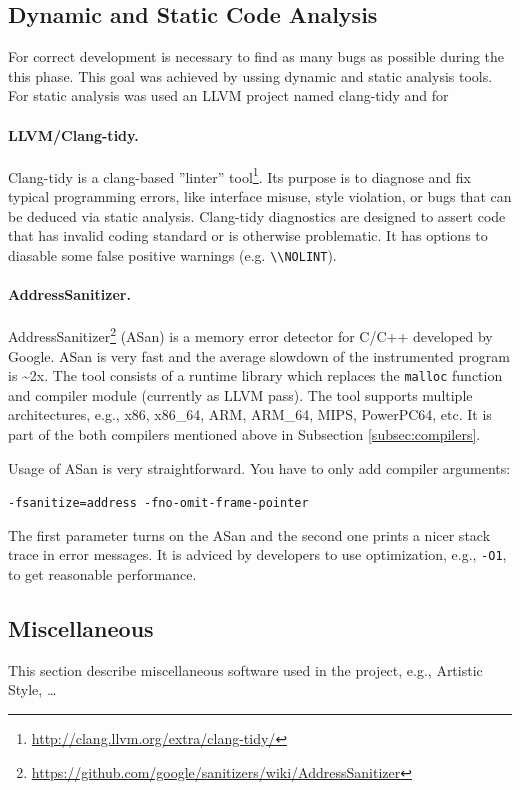 \subsection{Dynamic and Static Code Analysis}
For correct development is necessary to find as many bugs as possible during the this phase.
This goal was achieved by ussing dynamic and static analysis tools.
For static analysis was used an LLVM project named clang-tidy and for

\paragraph{LLVM/Clang-tidy.}
Clang-tidy is a clang-based ''linter'' tool\footnote{\url{http://clang.llvm.org/extra/clang-tidy/}}.
Its purpose is to diagnose and fix typical programming errors,
like interface misuse, style violation, or bugs that can be deduced via static analysis.
Clang-tidy diagnostics are designed to assert code that has invalid coding standard or is otherwise problematic.
It has options to diasable some false positive warnings (e.g. \texttt{\textbackslash\textbackslash NOLINT}).

\paragraph{AddressSanitizer.}
AddressSanitizer\footnote{\url{https://github.com/google/sanitizers/wiki/AddressSanitizer}} (ASan) is a memory error detector for C/C++ developed by Google.
ASan is very fast and the average slowdown of the instrumented program is \textasciitilde 2x.
The tool consists of a runtime library which replaces the \texttt{malloc} function and compiler module (currently as LLVM pass).
The tool supports multiple architectures, e.g., x86, x86\_64, ARM, ARM\_64, MIPS, PowerPC64, etc.
It is part of the both compilers mentioned above in Subsection \ref{subsec:compilers}.

Usage of ASan is very straightforward. You have to only add compiler arguments:\\
\begin{center}
	\texttt{-fsanitize=address -fno-omit-frame-pointer}
\end{center}
The first parameter turns on the ASan and the second one prints a nicer stack trace in error messages.
It is adviced by developers to use optimization, e.g., \texttt{-O1}, to get reasonable performance.

\subsection{Miscellaneous}
This section describe miscellaneous software used in the project, e.g., Artistic Style, \ldots
